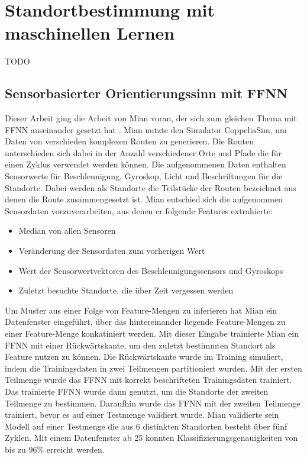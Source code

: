 \section{Standortbestimmung mit maschinellen Lernen}
TODO

\subsection{Sensorbasierter Orientierungssinn mit FFNN}
Dieser Arbeit ging die Arbeit von Mian voran, der sich zum gleichen Thema mit FFNN auseinander gesetzt hat \cite{naveedThesis}.
Mian nutzte den Simulator CoppeliaSim, um Daten von verschieden komplexen Routen zu generieren.
Die Routen unterschieden sich dabei in der Anzahl verschiedener Orte und Pfade die für einen Zyklus verwendet werden können.
Die aufgenommenen Daten enthalten Sensorwerte für Beschleunigung, Gyroskop, Licht und Beschriftungen für die Standorte.
Dabei werden als Standorte die Teilstücke der Routen bezeichnet aus denen die Route zusammengesetzt ist.
\newline
\newline
Mian entschied sich die aufgenommen Sensordaten vorzuverarbeiten, aus denen er folgende Features extrahierte:
\begin{itemize}
    \item Median von allen Sensoren
    \item Veränderung der Sensordaten zum vorherigen Wert
    \item Wert der Sensorwertvektoren des Beschleunigungssensors und Gyroskops
    \item Zuletzt besuchte Standorte, die über Zeit vergessen werden
\end{itemize}
Um Muster aus einer Folge von Feature-Mengen zu inferieren hat Mian ein Datenfenster eingeführt, über das
hintereinander liegende Feature-Mengen zu einer Feature-Menge konkatiniert werden.
\newline
\newline
Mit dieser Eingabe trainierte Mian ein FFNN mit einer Rückwärtskante, um den zuletzt bestimmten Standort als Feature nutzen zu können.
Die Rückwärtskante wurde im Training simuliert, indem die Trainingsdaten in zwei Teilmengen partitioniert wurden.
Mit der ersten Teilmenge wurde das FFNN mit korrekt beschrifteten Trainingsdaten trainiert.
Das trainierte FFNN wurde dann genutzt, um die Standorte der zweiten Teilmenge zu bestimmen.
Daraufhin wurde das FFNN mit der zweiten Teilmenge trainiert, bevor es auf einer Testmenge validiert wurde.
\newline
\newline
Mian validierte sein Modell auf einer Testmenge die aus 6 distinkten Standorten besteht über fünf Zyklen.
Mit einem Datenfenster ab 25 konnten Klassifizierungsgenauigkeiten von bis zu 96\% erreicht werden.




\iffalse
\begin{itemize}
    \item Vision Based
\end{itemize}
\fi